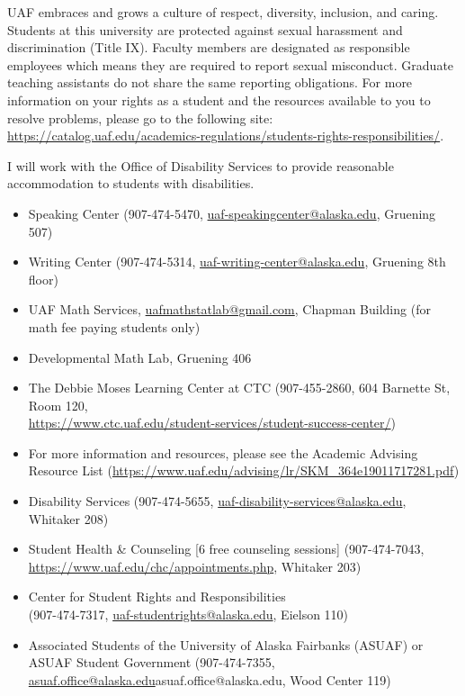 \documentclass[12pt]{article}
\def\mailto#1{\href{mailto:#1}{#1}}
\begin{document}
 UAF embraces and grows a culture of respect, diversity, inclusion, and caring. Students at this university are protected against sexual harassment and discrimination (Title IX). Faculty members are designated as responsible employees which means they are required to report sexual misconduct. Graduate teaching assistants do not share the same reporting obligations. For more information on your rights as a student and the resources available to you to resolve problems, please go to the following site: \\
\url{https://catalog.uaf.edu/academics-regulations/students-rights-responsibilities/}.

 I will work with the Office of Disability Services to provide reasonable accommodation to students with disabilities.

\begin{itemize}
\setlength\itemsep{0em}
        \item Speaking Center (907-474-5470,
        \mailto{uaf-speakingcenter@alaska.edu}, Gruening 507)
\item Writing Center (907-474-5314, \mailto{uaf-writing-center@alaska.edu}, Gruening 8th floor)
\item UAF Math Services, \mailto{uafmathstatlab@gmail.com}, Chapman Building (for math fee paying students only)
\item Developmental Math Lab, Gruening 406
\item The Debbie Moses Learning Center at CTC (907-455-2860, 604 Barnette St, Room 120,\\ \mailto{https://www.ctc.uaf.edu/student-services/student-success-center/})
\item For more information and resources, please see the Academic Advising Resource List (\url{https://www.uaf.edu/advising/lr/SKM_364e19011717281.pdf})
\end{itemize}

\begin{itemize}
\setlength\itemsep{0em}
\item Disability Services (907-474-5655, \mailto{uaf-disability-services@alaska.edu}, Whitaker 208)
\item Student Health \& Counseling [6 free counseling sessions] (907-474-7043, \url{https://www.uaf.edu/chc/appointments.php}, Whitaker 203)
\item Center for Student Rights and Responsibilities \\(907-474-7317, \mailto{uaf-studentrights@alaska.edu}, Eielson 110)
\item Associated Students of the University of Alaska Fairbanks (ASUAF) or ASUAF Student Government (907-474-7355, \mailto{asuaf.office@alaska.edu}{asuaf.office@alaska.edu}, Wood Center 119)
\end{itemize}
\end{document}
